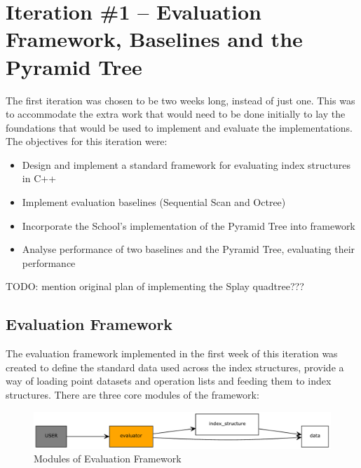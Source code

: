 \section{Iteration \#1 -- Evaluation Framework, Baselines and the Pyramid Tree}

The first iteration was chosen to be two weeks long, instead of just one. This was to accommodate the extra work that would need to be done initially to lay the foundations that would be used to implement and evaluate the implementations. The objectives for this iteration were:
\begin{itemize}
	\item Design and implement a standard framework for evaluating index structures in C++
	\item Implement evaluation baselines (Sequential Scan and Octree)
	\item Incorporate the School's implementation of the Pyramid Tree into framework
	\item Analyse performance of two baselines and the Pyramid Tree, evaluating their performance
\end{itemize}

TODO: mention original plan of implementing the Splay quadtree???

\subsection{Evaluation Framework}

The evaluation framework implemented in the first week of this iteration was created to define the standard data used across the index structures, provide a way of loading point datasets and operation lists and feeding them to index structures. There are three core modules of the framework:

\begin{figure}
	\vspace{-40pt}
	\begin{center}
		\includegraphics[scale=0.4]{figures/evaluation_framework.pdf}
	\end{center}
	\vspace{-20pt}
	\caption{Modules of Evaluation Framework}
	\label{fig:evaluation-framework}
\end{figure}

